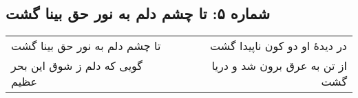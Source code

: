 \begin{center}
\section*{شماره ۵: تا چشم دلم به نور حق بینا گشت}
\label{sec:005}
\begin{longtable}{l p{0.5cm} r}
تا چشم دلم به نور حق بینا گشت
&&
در دیدهٔ او دو کون ناپیدا گشت
\\
گویی که دلم ز شوق این بحر عظیم
&&
از تن به عرق برون شد و دریا گشت
\\
\end{longtable}
\end{center}
